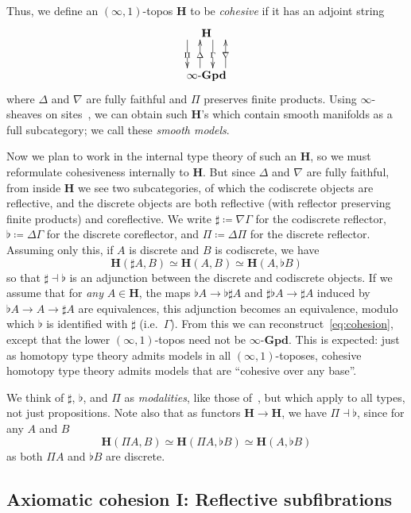 \documentclass[copyright]{eptcs}
\newcommand{\ig}{\ensuremath{\infty\text{-}\mathbf{Gpd}}\xspace}
\renewcommand{\H}{\ensuremath{\mathbf{H}}\xspace}
\newcommand{\io}{\ensuremath{(\infty,1)}}
\begin{document}
Thus, we define an \io-topos \H to be \emph{cohesive} if it has an adjoint string
\begin{equation}
\vcenter{\xymatrix{
  \H \ar@<2mm>[d]|{\Gamma} \ar@<-6mm>[d]|{\Pi}\\
  \ig \ar@<2mm>[u]|{\Delta} \ar@<-6mm>[u]|{\nabla}
}}\label{eq:cohesion}
\end{equation}
where $\Delta$ and $\nabla$ are fully faithful and $\Pi$ preserves finite products.
Using $\infty$-sheaves on sites~\cite{CohesiveSites}, we can obtain such \H's which contain smooth manifolds as a full subcategory; we call these \emph{smooth models}.

Now we plan to work in the internal type theory of such an \H, so we must reformulate cohesiveness internally to \H.
But since $\Delta$ and $\nabla$ are fully faithful, from inside \H we see two subcategories, of which the codiscrete objects are reflective, and the discrete objects are both reflective (with reflector preserving finite products) and coreflective.
We write $\sharp \coloneqq \nabla\Gamma$ for the codiscrete reflector, $\flat \coloneqq \Delta\Gamma$ for the discrete coreflector, and $\Pi \coloneqq \Delta\Pi$ for the discrete reflector.
Assuming only this, if $A$ is discrete and $B$ is codiscrete, we have
\[ \H(\sharp A,B) \simeq \H(A,B) \simeq \H(A,\flat B) \]
so that $\sharp\dashv\flat$ is an adjunction between the discrete and codiscrete objects.
If we assume that for \emph{any} $A\in\H$, the maps $\flat A\to \flat\sharp A$ and $\sharp \flat A\to\sharp A$ induced by $\flat A\to A\to \sharp A$ are equivalences, this adjunction becomes an equivalence, modulo which $\flat$ is identified with $\sharp$ (i.e.\ $\Gamma$).
From this we can reconstruct~\eqref{eq:cohesion}, except that the lower \io-topos need not be \ig.
This is expected: just as homotopy type theory admits models in all \io-toposes, cohesive homotopy type theory admits models that are ``cohesive over any base''.

We think of $\sharp$, $\flat$, and $\Pi$ as \emph{modalities}, like those of~\cite{AB}, but which apply to all types, not just propositions.
Note also that as functors $\H\to \H$, we have $\Pi\dashv\flat$, since for any $A$ and $B$
\[ \H(\Pi A,B)\simeq \H(\Pi A,\flat B) \simeq \H(A,\flat B) \]
as both $\Pi A$ and $\flat B$ are discrete.


\subsection{Axiomatic cohesion I: Reflective subfibrations}
\label{sec:axiomatic-cohesion-i}
\end{document}
